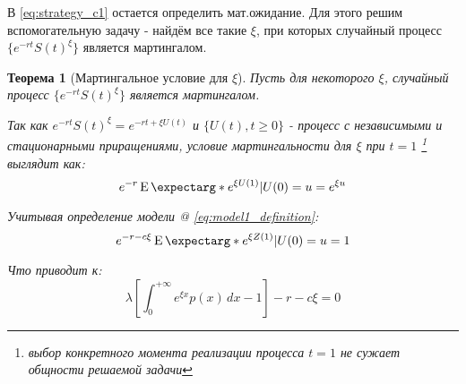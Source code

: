 \documentclass[a4paper,12pt]{article}
\makeatletter
\newtheorem{theorem}{Теорема}
\theoremstyle{definition}
\newcommand*{\rom}[1]{\expandafter\@slowromancap\romannumeral #1@}
\newcommand{\expect}{\operatorname{E}\expectarg}
\makeatother
\begin{document}
В \eqref{eq:strategy_c1} остается определить мат.ожидание. Для этого решим вспомогательную задачу - найдём все такие $\xi$, при которых случайный процесс $\{e^{-rt}S(t)^{\xi}\}$ является мартингалом.
\begin{theorem}[Мартингальное условие для $\xi$]\label{thm:martingale_cond_for_xi}
Пусть для некоторого $\xi$, случайный процесс $\{e^{-rt}S(t)^{\xi}\}$ является мартингалом. 

Так как $e^{-rt}S(t)^{\xi} = e^{-rt + \xi U(t)}$ и $\{U(t), t \ge 0\}$ - процесс с независимыми и стационарными приращениями, условие мартингальности для $\xi$ при $t = 1$ \footnote{выбор конкретного момента реализации процесса $t=1$ не сужает общности решаемой задачи} выглядит как:
\begin{equation}\label{eq:martingale_cond_for_xi}
e^{-r} \expect*{e^{\xi U(1)}|U(0) = u} = e ^ {\xi u}
\end{equation}

Учитывая определение модели \rom{1} \eqref{eq:model1_definition}:
\begin{equation}\label{eq:martingale_cond_for_xi_alt}
e^{-r - c\xi} \expect*{e^{\xi Z(1)}|U(0) = u} = 1
\end{equation}

Что приводит к:
\begin{equation}\label{eq:martingale_cond_for_xi_log}
\lambda \left[ \int_{0}^{+\infty} e^{\xi x} p(x) \,dx - 1  \right] - r - c \xi
 = 0
\end{equation}

\end{theorem}
\end{document}
